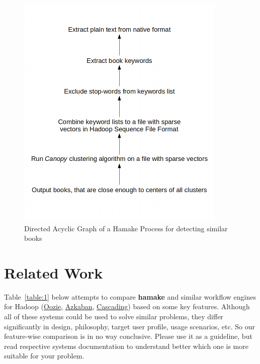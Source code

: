 \documentclass{article}
\begin{document}
\begin{figure}[htp]
\centering
\includegraphics[width=10cm]{SimilarityAlgDAG.png}
\caption{Directed Acyclic Graph of a Hamake Process for detecting similar books}
\label{fig:SimilarityAlgDAG}
\end{figure}

\section{Related Work}

Table~\ref{table:1} below attempts to compare \textbf{hamake} and similar
workflow engines for Hadoop
(\href{http://github.com/tucu00/oozie1}{Oozie},
\href{http://sna-projects.com/azkaban/}{Azkaban},
\href{http://www.cascading.org/}{Cascading}) based on some key
features. Although all of these systems could be used to solve similar
problems, they differ significantly in design, philosophy, target user
profile, usage scenarios, etc.  So our feature-wise comparison is in
no way conclusive. Please use it as a guideline, but read respective
systems documentation to understand better which one is more suitable
for your problem.
\end{document}
